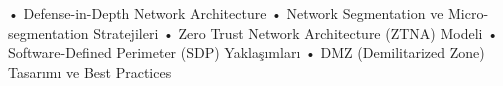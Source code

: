 • Defense-in-Depth Network Architecture
• Network Segmentation ve Micro-segmentation Stratejileri
• Zero Trust Network Architecture (ZTNA) Modeli
• Software-Defined Perimeter (SDP) Yaklaşımları
• DMZ (Demilitarized Zone) Tasarımı ve Best Practices